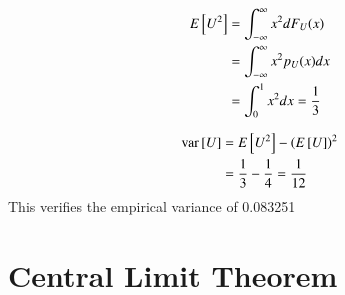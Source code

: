 \documentclass[journal,12pt,twocolumn]{IEEEtran}
\begin{document}
\begin{align}
	E{}\left[U^2\right] &= \int_{-\infty}^{\infty}x^2dF_U(x) \\
	&= \int_{-\infty}^{\infty}x^2p_U(x)dx \\
	&= \int_{0}^{1}x^2dx = \frac{1}{3}
\end{align}


\begin{align}
	\text{var}{}\left[U\right] &= E{}\left[U^2\right] - \left(E{}\left[U\right]\right)^2 \\
	&= \frac{1}{3} - \frac{1}{4} = \frac{1}{12} 
\end{align}
This verifies the empirical variance of 0.083251\\
\section{Central Limit Theorem}
%
\end{document}
